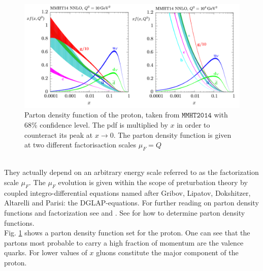 \begin{figure}[!htbp]
\begin{center}
\includegraphics[scale=0.6]{figures/pdf's}
\caption{Parton density function of the proton, taken from $\mathtt{MMHT2014}$ \cite{Harland-Lang:2014zoa} with 68\% confidence level. The pdf is multiplied by $x$ in order to counteract its peak at $x \to 0$. The parton density function is given at two different factorisaction scales $\mu_F = Q$}\label{fig:pdfs}
\end{center}
\end{figure}\\
They actually depend on an arbitrary energy scale referred to as the factorization scale $\mu_F$. The $\mu_F$ evolution is given within the scope of preturbation theory by coupled integro-differential equations named after Gribov, Lipatov, Dokshitzer, Altarelli and Parisi: the DGLAP-equations. For further reading on parton density functions and factorization see \cite{dissertori2003quantum} and \cite{Collins:1989gx}. See \cite{Brock:1993sz} for how to determine parton density functions.\\
Fig. \ref{fig:pdfs} shows a parton density function set for the proton. One can see that the partons most probable to carry a high fraction of momentum are the valence quarks. For lower values of $x$ gluons constitute the major component of the proton.
